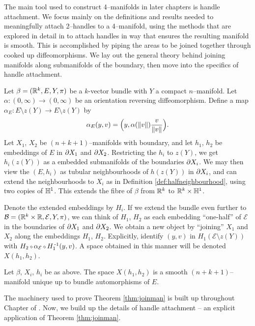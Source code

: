 The main tool used to construct 4--manifolds in later chapters is handle attachment.
We focus mainly on the definitions and results needed to meaningfully attach 2--handles to a 4--manifold, using the methods that are explored in detail in \cite{Kosi93} to attach handles in way that ensures the resulting manifold is smooth.
This is accomplished by piping the areas to be joined together through cooked up diffeomorphisms.
We lay out the general theory behind joining manifolds along submanifolds of the boundary, then move into the specifics of handle attachment.

Let $\beta=(\mathbb{R}^k,E,Y,\pi)$ be a $k$-vector bundle with $Y$ a compact $n$--manifold.
Let $\alpha:(0,\infty)\to(0,\infty)$ be an orientation reversing diffeomorphism.
Define a map $\alpha_E: E\setminus z(Y) \to E\setminus z(Y)$ by
\begin{equation}
	\label{eqn:alpha}
	\alpha_E(y,v) = \Big(y,\alpha(\left\lVert v \right\rVert)\frac{v}{\left\lVert v \right\rVert}\Big).
\end{equation}
Let $X_1$, $X_2$ be $(n+k+1)$--manifolds with boundary, and let $h_1$, $h_2$ be embeddings of $E$ in $\partial X_1$ and $\partial X_2$.
Restricting the $h_i$ to $z(Y)$, we get $h_i(z(Y))$ as a embedded submanifolds of the boundaries $\partial X_i$.
We may then view the $(E,h_i)$ as tubular neighbourhoods of $h(z(Y))$ in $\partial X_i$, and can extend the neighbourhoods to $X_i$ as in Definition \ref{def:halfneighbourhood}, using two copies of $\mathbb{H}^1$.
This extends the fibre of $\beta$ from $\mathbb{R}^k$ to $\mathbb{R}^k\times \mathbb{H}^1$.

Denote the extended embeddings by $H_i$.
If we extend the bundle even further to $\mathcal{B}=(\mathbb{R}^k\times \mathbb{R},\mathcal{E},Y,\pi)$, we can think of $H_1$, $H_2$ as each embedding ``one-half'' of $\mathcal{E}$ in the boundaries of $\partial X_1$ and $\partial X_2$.
We obtain a new object by ``joining'' $X_1$ and $X_2$ along the embeddings $H_1$, $H_2$.
Explicitly, identify $(y,v)$ in $H_1(\mathcal{E}\setminus z(Y))$ with $H_2\comp \alpha_\mathcal{E}\comp H_1\inv(y,v)$.
A space obtained in this manner will be denoted $X(h_1,h_2)$.

\begin{theorem}
	\label{thm:joinman}
	Let $\beta$, $X_i$, $h_i$ be as above.
	The space $X(h_1,h_2)$ is a smooth $(n+k+1)$--manifold unique up to bundle automorphisms of $E$.	
\end{theorem}

The machinery used to prove Theorem \ref{thm:joinman} is built up throughout Chapter  of \cite{Kosi93}.
Now, we build up the details of handle attachment -- an explicit application of Theorem \ref{thm:joinman}.

